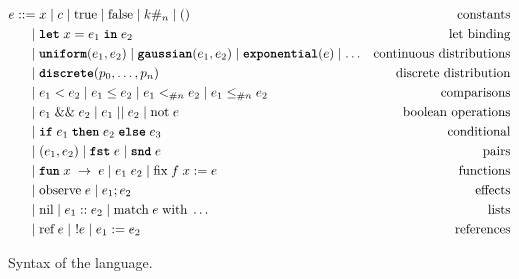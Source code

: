\begin{figure}[!t]
\begin{align*}
e ::= &\; x \mid c \mid \text{true} \mid \text{false} \mid k\#_{n} \mid () & \text{constants} \\
    | &\; \text{\ttfamily\bfseries let} \; x = e_1\; \text{\ttfamily\bfseries in} \; e_2  & \text{let binding} \\
    | &\; \text{\ttfamily\bfseries uniform}(e_1, e_2) \mid \text{\ttfamily\bfseries gaussian}(e_1, e_2) \mid \text{\ttfamily\bfseries exponential}(e) \mid \ldots & \text{continuous distributions} \\
    | &\; \text{\ttfamily\bfseries discrete}(p_0, \ldots, p_{n})      & \text{discrete distribution} \\
    | &\; e_1 < e_2 \mid e_1 \leq e_2 \mid e_1 <_{\#{n}} e_2 \mid e_1 \leq_{\#{n}} e_2 & \text{comparisons} \\
    | &\; e_1 \mathrel{\&\&} e_2 \mid e_1 \mathrel{||} e_2 \mid \text{not}\; e & \text{boolean operations} \\
    | &\; \text{\ttfamily\bfseries if} \; e_1\; \text{\ttfamily\bfseries then} \; e_2\; \text{\ttfamily\bfseries else} \; e_3 & \text{conditional} \\
    | &\; (e_1, e_2) \mid \text{\ttfamily\bfseries fst} \; e \mid \text{\ttfamily\bfseries snd} \; e & \text{pairs} \\
    | &\; \text{\ttfamily\bfseries fun} \; x \; \rightarrow \; e \mid e_1 \; e_2 \mid \text{fix}\; f\; x := e & \text{functions} \\
    | &\; \text{observe}\; e \mid e_1; e_2 & \text{effects} \\
    | &\; \text{nil} \mid e_1 :: e_2 \mid \text{match}\; e\; \text{with}\; \ldots & \text{lists} \\
    | &\; \text{ref}\; e \mid\ !e \mid e_1 := e_2 & \text{references}
\end{align*}
\caption{Syntax of the \Slice{} language.}
\label{fig:grammar}
\end{figure}